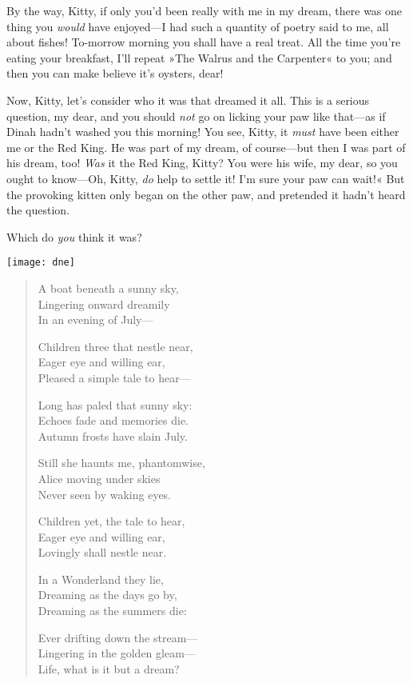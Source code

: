 By the way, Kitty, if only you'd been really with me in my dream, there was one thing you \textit{would} have enjoyed—I had such a quantity of poetry said to me, all about fishes! To-morrow morning you shall have a real treat. All the time you're eating your breakfast, I'll repeat »The Walrus and the Carpenter« to you; and then you can make believe it's oysters, dear!

Now, Kitty, let's consider who it was that dreamed it all. This is a serious question, my dear, and you should \textit{not} go on licking your paw like that—as if Dinah hadn't washed you this morning! You see, Kitty, it \textit{must} have been either me or the Red King. He was part of my dream, of course—but then I was part of his dream, too! \textit{Was} it the Red King, Kitty? You were his wife, my dear, so you ought to know—Oh, Kitty, \textit{do} help to settle it! I'm sure your paw can wait!« But the provoking kitten only began on the other paw, and pretended it hadn't heard the question.

Which do \textit{you} think it was?

\vfill
\centerline{\texttt{[image: dne]}}
\vfill
\clearpage

\vspace*{\fill}\begin{verse}
A boat beneath a sunny sky,\\
Lingering onward dreamily\\
In an evening of July—

Children three that nestle near,\\
Eager eye and willing ear,\\
Pleased a simple tale to hear—

Long has paled that sunny sky:\\
Echoes fade and memories die.\\
Autumn frosts have slain July.

Still she haunts me, phantomwise,\\
Alice moving under skies\\
Never seen by waking eyes.

Children yet, the tale to hear,\\
Eager eye and willing ear,\\
Lovingly shall nestle near.

In a Wonderland they lie,\\
Dreaming as the days go by,\\
Dreaming as the summers die:

Ever drifting down the stream—\\
Lingering in the golden gleam—\\
Life, what is it but a dream?
\end{verse}
\vfill
\thispagestyle{plain}
